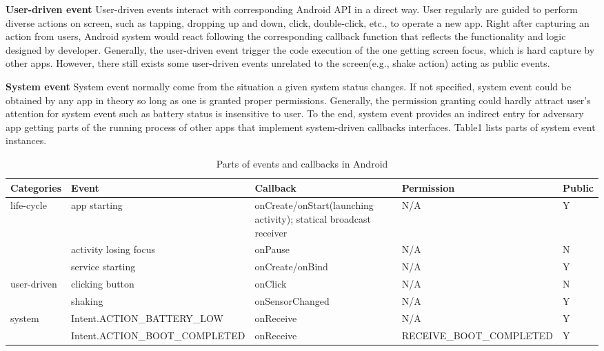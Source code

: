 \textbf{User-driven event} User-driven events interact with corresponding Android API in a direct way. User regularly are guided to perform diverse actions on screen, such as tapping, dropping up and down, click, double-click, etc., to operate a new app. Right after capturing an action from users, Android system would react following the  corresponding callback function that reflects the functionality and logic designed by developer. Generally, the user-driven event trigger the code execution of the one getting screen focus, which is hard capture by other apps. However, there still exists some user-driven events unrelated to the screen(e.g., shake action) acting as public events. 

\textbf{System event} System event normally come from the situation a given system status changes. If not specified, system event could be obtained by any app in theory so long as one is granted proper permissions. Generally, the permission granting could hardly attract user's attention for system event such as battery status is insensitive to user. To the end, system event provides an indirect entry for adversary app getting parts of the running process of other apps that implement system-driven callbacks interfaces. Table1 lists parts of system event instances.

\begin{table}[t]
\centering
 \caption{\label{tab:events}Parts of events and callbacks in Android}
 \begin{tabularx}{\linewidth}{XXXXX} 
  \toprule
  Categories & Event & Callback & Permission & Public \\
  \midrule
  life-cycle & app starting & onCreate/onStart(launching activity); statical broadcast receiver & N/A & Y\\
             & activity losing focus & onPause & N/A & N\\
             & service starting & onCreate/onBind & N/A & Y\\
             
  user-driven & clicking button & onClick & N/A & N\\
              & shaking & onSensorChanged & N/A & Y\\
              
  system  & Intent.ACTION\_BATTERY\_LOW & onReceive & N/A & Y \\
          & Intent.ACTION\_BOOT\_COMPLETED & onReceive & RECEIVE\_BOOT\_COMPLETED & Y \\
  
  \bottomrule
 \end{tabularx}
\end{table}

